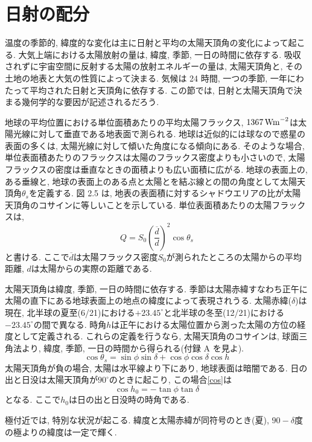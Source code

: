 \documentclass[a4j,12pt,openbib,oneside,dvipdfmx]{jbook}
\begin{document}
\section{日射の配分}
温度の季節的, 緯度的な変化は主に日射と平均の太陽天頂角の変化によって起こる. 大気上端における太陽放射の量は, 緯度, 季節, 一日の時間に依存する. 吸収されずに宇宙空間に反射する太陽の放射エネルギーの量は, 太陽天頂角と, その土地の地表と大気の性質によって決まる. 気候は 24 時間, 一つの季節, 一年にわたって平均された日射と天頂角に依存する. この節では, 日射と太陽天頂角で決まる幾何学的な要因が記述されるだろう.
\par
地球の平均位置における単位面積あたりの平均太陽フラックス, $1367\,\rm{Wm}^{-2}$は太陽光線に対して垂直である地表面で測られる. 
地球は近似的には球なので惑星の表面の多くは, 太陽光線に対して傾いた角度になる傾向にある. 
そのような場合, 単位表面積あたりのフラックスは太陽のフラックス密度よりも小さいので, 太陽フラックスの密度は垂直なときの面積よりも広い面積に広がる. 
地球の表面上の, ある垂線と, 地球の表面上のある点と太陽とを結ぶ線との間の角度として太陽天頂角$\theta_s$を定義する. 
図 2.5 は, 地表の表面積に対するシャドウエリアの比が太陽天頂角のコサインに等しいことを示している. 
単位表面積あたりの太陽フラックスは,
\begin{equation}
  Q=S_0\left(\frac{\overline{d}}{d}\right)^2\cos{\theta_s}
\end{equation}
と書ける. ここで$\overline{d}$は太陽フラックス密度$S_0$が測られたところの太陽からの平均距離, $d$は太陽からの実際の距離である.
\par
太陽天頂角は緯度, 季節, 一日の時間に依存する. 季節は太陽赤緯すなわち正午に太陽の直下にある地球表面上の地点の緯度によって表現されうる. 
太陽赤緯($\delta$)は現在, 北半球の夏至(6/21)における$+23.45^\circ$と北半球の冬至(12/21)における$-23.45^\circ$の間で異なる.
時角$h$は正午における太陽位置から測った太陽の方位の経度として定義される.
これらの定義を行うなら, 太陽天頂角のコサインは, 球面三角法より, 緯度, 季節, 一日の時間から得られる(付録 A を見よ).
\begin{equation}
  \cos{\theta_s}=\sin\phi\sin\delta+\cos\phi\cos\delta\cos{h} \label{cos}
\end{equation}
太陽天頂角が負の場合, 太陽は水平線より下にあり, 地球表面は暗闇である.
日の出と日没は太陽天頂角が$90^\circ$のときに起こり, この場合\eqref{cos}は
\begin{equation}
  \cos{h_0}=-\tan\phi\tan\delta
\end{equation}
となる. ここで$h_0$は日の出と日没時の時角である.
\par
極付近では, 特別な状況が起こる. 緯度と太陽赤緯が同符号のとき(夏), $90-\delta$度の極よりの緯度は一定で輝く. 
\end{document}
